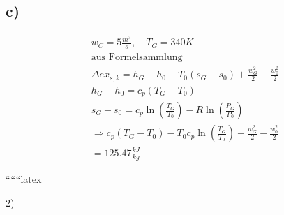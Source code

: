 

\subsection*{c)}

\begin{align*}
&w_C = 5 \frac{m^3}{s}, \quad T_G = 340K \\
&\text{aus Formelsammlung} \\
&\Delta ex_{s,k} = h_G - h_0 - T_0 (s_G - s_0) + \frac{w_G^2}{2} - \frac{w_0^2}{2} \\
&h_G - h_0 = c_p (T_G - T_0) \\
&s_G - s_0 = c_p \ln \left( \frac{T_G}{T_0} \right) - R \ln \left( \frac{P_G}{P_0} \right) \\
&\Rightarrow c_p (T_G - T_0) - T_0 c_p \ln \left( \frac{T_G}{T_0} \right) + \frac{w_G^2}{2} - \frac{w_0^2}{2} \\
&= 125.47 \frac{kJ}{kg}
\end{align*}

``````latex


2)